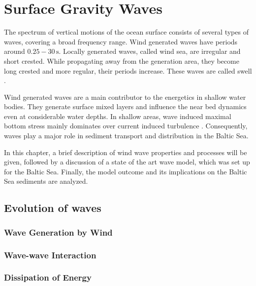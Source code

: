 \chapter{Surface Gravity Waves}
\label{kap-waves}
The spectrum of vertical motions of the ocean surface consists of several types 
of waves, covering a broad frequency range.  Wind generated 
waves have periods around $0.25 - 30\,\text{s}$. Locally generated waves, called 
wind sea, are irregular and short crested. While propagating away from the 
generation area, they become long crested and more regular, their periods 
increase. These waves are called swell \citep[][]{holthuijsen2007}. 

Wind generated waves are a main contributor to the energetics in shallow water 
bodies. They generate surface mixed layers and influence the near bed dynamics 
even at considerable water depths. In shallow areas, wave induced maximal 
bottom stress mainly dominates over current induced turbulence 
\citep[][]{jonsson2004}. Consequently, waves play a 
major role in sediment transport and distribution in the Baltic Sea.

In this chapter, a brief description of wind wave properties and processes will 
be given, followed by a discussion of a state of the art wave model, which was 
set up for the Baltic Sea. Finally, the model outcome and its implications on 
the Baltic Sea sediments are analyzed.

\section{Evolution of waves}

\subsection{Wave Generation by Wind}

\subsection{Wave-wave Interaction}

\subsection{Dissipation of Energy}

